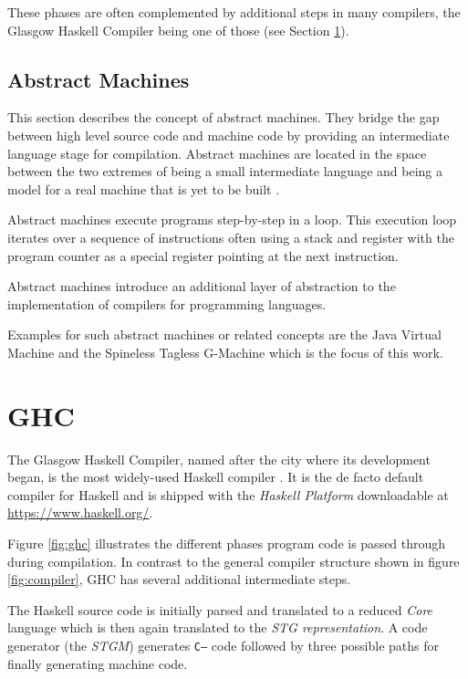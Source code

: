\documentclass[runningheads]{llncs}
\begin{document}
These phases are often complemented by additional steps in many compilers, the Glasgow Haskell Compiler being one of those (see Section \ref{sec:ghc}).

\subsection{Abstract Machines}
This section describes the concept of abstract machines. They bridge the gap between high level source code and machine code by providing an intermediate language stage for compilation. Abstract machines are located in the space between the two extremes of being a small intermediate language and being a model for a real machine that is yet to be built \cite{diehl2000abstract}.

Abstract machines execute programs step-by-step in a loop. This execution loop iterates over a sequence of instructions often using a stack and register with the program counter as a special register pointing at the next instruction. \cite{diehl2000abstract}

Abstract machines introduce an additional layer of abstraction to the implementation of compilers for programming languages.

Examples for such abstract machines or related concepts are the Java Virtual Machine and the Spineless Tagless G-Machine which is the focus of this work.

\section{GHC}
\label{sec:ghc}
The Glasgow Haskell Compiler, named after the city where its development began, is the most widely-used Haskell compiler \cite{marlow2007faster}. It is the de facto default compiler for Haskell and is shipped with the \textit{Haskell Platform} downloadable at \url{https://www.haskell.org/}.

Figure \ref{fig:ghc} illustrates the different phases program code is passed through during compilation. In contrast to the general compiler structure shown in figure \ref{fig:compiler}, GHC has several additional intermediate steps. 

The Haskell source code is initially parsed and translated to a reduced \textit{Core} language which is then again translated to the \textit{STG representation}. A code generator (the \textit{STGM}) generates \texttt{C--} code followed by three possible paths for finally generating machine code.
\end{document}
